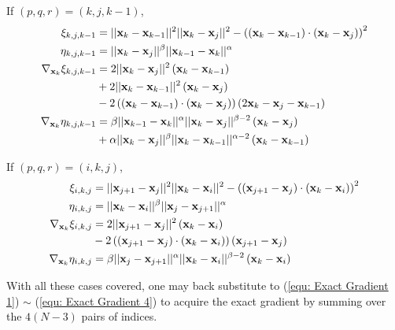 \documentclass[../dissertation.tex]{subfiles}
\begin{document}
If $\left( p,q,r \right) = \left( k,j,k-1 \right)$,
\begin{align*}
    \xi_{k,j,k-1} &= \lvert \lvert \mathbf{x}_{k} - \mathbf{x}_{k-1} \rvert \rvert^2 \lvert \lvert \mathbf{x}_k - \mathbf{x}_j \rvert \rvert^2- \left( \left( \mathbf{x}_{k} - \mathbf{x}_{k-1} \right) \cdot \left( \mathbf{x}_{k} - \mathbf{x}_{j} \right) \right)^2 \\
    \eta_{k,j,k-1} &= \lvert \lvert \mathbf{x}_k - \mathbf{x}_j \rvert \rvert^{\beta} \lvert \lvert \mathbf{x}_{k-1} - \mathbf{x}_{k} \rvert \rvert^{\alpha} \\
    \nabla_{\mathbf{x}_k} \xi_{k,j,k-1} &= 2 \lvert \lvert \mathbf{x}_k - \mathbf{x}_j \rvert \rvert^2 \left( \mathbf{x}_k - \mathbf{x}_{k-1} \right) \\
    &+ 2 \lvert \lvert \mathbf{x}_k - \mathbf{x}_{k-1} \rvert \rvert^2 \left( \mathbf{x}_k - \mathbf{x}_j \right) \\
    &- 2 \left(\left( \mathbf{x}_k - \mathbf{x}_{k-1} \right) \cdot \left( \mathbf{x}_k - \mathbf{x}_j \right)\right) \left( 2 \mathbf{x}_k - \mathbf{x}_j - \mathbf{x}_{k-1} \right) \\
    \nabla_{\mathbf{x}_k} \eta_{k,j,k-1} &= \beta \lvert \lvert \mathbf{x}_{k-1} - \mathbf{x}_k \rvert \rvert^{\alpha} \lvert \lvert \mathbf{x}_k - \mathbf{x}_j \rvert \rvert^{\beta - 2} \left( \mathbf{x}_k - \mathbf{x}_j \right) \\
    &+ \alpha \lvert \lvert \mathbf{x}_k - \mathbf{x}_j \rvert \rvert^{\beta} \lvert \lvert \mathbf{x}_k - \mathbf{x}_{k-1} \rvert \rvert^{\alpha - 2} \left( \mathbf{x}_k - \mathbf{x}_{k-1} \right)
\end{align*}

If $\left( p,q,r \right) = \left( i,k,j \right)$,
\begin{align*}
    \xi_{i,k,j} &= \lvert \lvert \mathbf{x}_{j+1} - \mathbf{x}_{j} \rvert \rvert^2 \lvert \lvert \mathbf{x}_k - \mathbf{x}_i \rvert \rvert^2- \left( \left( \mathbf{x}_{j+1} - \mathbf{x}_{j} \right) \cdot \left( \mathbf{x}_{k} - \mathbf{x}_{i} \right) \right)^2 \\
    \eta_{i,k,j} &= \lvert \lvert \mathbf{x}_k - \mathbf{x}_i \rvert \rvert^{\beta} \lvert \lvert \mathbf{x}_{j} - \mathbf{x}_{j+1} \rvert \rvert^{\alpha} \\
    \nabla_{\mathbf{x}_k} \xi_{i,k,j} &= 2 \lvert \lvert \mathbf{x}_{j+1} - \mathbf{x}_j \rvert \rvert^2 \left( \mathbf{x}_k - \mathbf{x}_i \right) \\
    &- 2 \left(\left( \mathbf{x}_{j+1} - \mathbf{x}_j \right) \cdot \left( \mathbf{x}_k - \mathbf{x}_i \right)\right) \left( \mathbf{x}_{j+1} - \mathbf{x}_j \right) \\
    \nabla_{\mathbf{x}_k} \eta_{i,k,j} &= \beta \lvert \lvert \mathbf{x}_j - \mathbf{x}_{j+1} \rvert \rvert^{\alpha} \lvert \lvert \mathbf{x}_k - \mathbf{x}_i \rvert \rvert^{\beta - 2} \left( \mathbf{x}_k - \mathbf{x}_i \right)
\end{align*}

With all these cases covered, one may back substitute to (\ref{equ: Exact Gradient 1}) $\sim$ (\ref{equ: Exact Gradient 4}) to acquire the exact gradient by summing over the $4\left( N-3 \right)$ pairs of indices.
\end{document}
